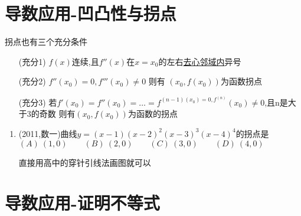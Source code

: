 \documentclass[12pt, a4paper, oneside, UTF8]{ctexbook}
\begin{document}
\section{导数应用-凹凸性与拐点}
\begin{remark}
    拐点也有三个充分条件
    \begin{enumerate}
        \item [(充分1)] $f(x)$连续,且$f''(x)$在$x=x_0$的左右\underline{去心邻域内}异号
        \item [(充分2)] $f''(x_0)=0,f'''(x_0)\neq 0$ 则有 $(x_0,f(x_0))$为函数拐点
        \item [(充分3)] 若$f'(x_0)=f''(x_0)=\ldots=f^{(n-1)(x_0)=0,f^{(n)}}(x_0)\neq 0$,且n是大于3的奇数
        则有$(x_0,f(x_0))$为函数的拐点
    \end{enumerate}
\end{remark}
\begin{enumerate}[label=\arabic*.,start=20]
    \item  (2011,数一)曲线$y=(x-1)(x-2)^2(x-3)^3(x-4)^4$的拐点是 \\
    $(A)\ (1,0) \qquad (B)\ (2,0) \qquad (C)\ (3,0) \qquad (D)\ (4,0)$
    
    \begin{solution}
    直接用高中的穿针引线法画图就可以
    \end{solution}
\end{enumerate}

\section{导数应用-证明不等式}
\end{document}
